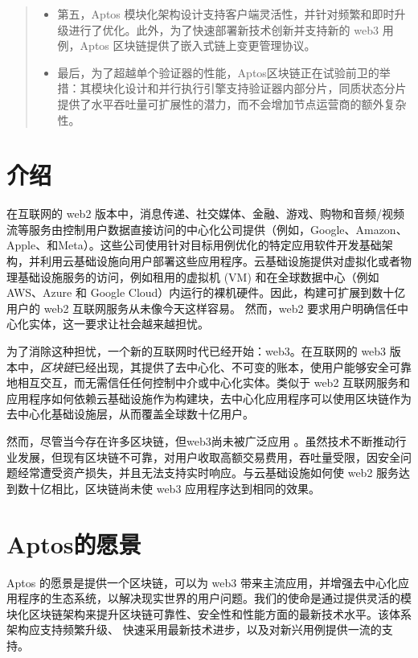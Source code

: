 \documentclass{article}
\begin{document}
\begin{abstract}
\begin{itemize}
 \item 第五，Aptos 模块化架构设计⽀持客户端灵活性，并针对频繁和即时升级进行了优化。此外，为了快速部署新技术创新并⽀持新的 web3 ⽤例，Aptos 区块链提供了嵌⼊式链上变更管理协议。 

 \item 最后，为了超越单个验证器的性能，Aptos区块链正在试验前卫的举措：其模块化设计和并行执行引擎支持验证器内部分片，同质状态分片提供了水平吞吐量可扩展性的潜力，而不会增加节点运营商的额外复杂性。

\end{itemize}

\end{abstract}

\section{介绍}

在互联⽹的 web2 版本中，消息传递、社交媒体、⾦融、游戏、购物和⾳频/视频流等服务由控制⽤户数据直接访问的中⼼化公司提供（例如，Google、Amazon、Apple、和Meta）。这些公司使⽤针对⽬标⽤例优化的特定应⽤软件开发基础架构，并利⽤云基础设施向用户部署这些应用程序。云基础设施提供对虚拟化或者物理基础设施服务的访问，例如租⽤的虚拟机 (VM) 和在全球数据中⼼（例如 AWS、Azure 和 Google Cloud）内运行的裸机硬件。因此，构建可扩展到数⼗亿⽤户的 web2 互联网服务从未像今天这样容易。 然⽽，web2 要求⽤户明确信任中⼼化实体，这⼀要求让社会越来越担忧。

为了消除这种担忧，⼀个新的互联⽹时代已经开始：web3。在互联⽹的 web3 版本中，\emph{区块链}已经出现，其提供了去中心化、不可变的账本，使⽤户能够安全可靠地相互交互，而无需信任任何控制中介或中⼼化实体。类似于 web2 互联⽹服务和应⽤程序如何依赖云基础设施作为构建块，去中⼼化应⽤程序可以使⽤区块链作为去中⼼化基础设施层，从而覆盖全球数⼗亿⽤户。

然⽽，尽管当今存在许多区块链，但web3尚未被广泛应用 \cite{a16_state}。虽然技术不断推动行业发展，但现有区块链不可靠，对⽤户收取⾼额交易费⽤，吞吐量受限，因安全问题经常遭受资产损失，并且⽆法⽀持实时响应。与云基础设施如何使 web2 服务达到数⼗亿相⽐，区块链尚未使 web3 应⽤程序达到相同的效果。


\section{Aptos的愿景}

Aptos 的愿景是提供⼀个区块链，可以为 web3 带来主流应⽤，并增强去中⼼化应⽤程序的⽣态系统，以解决现实世界的⽤户问题。我们的使命是通过提供灵活的模块化区块链架构来提升区块链可靠性、安全性和性能⽅⾯的最新技术⽔平。该体系架构应⽀持频繁升级、 快速采⽤最新技术进步，以及对新兴⽤例提供⼀流的⽀持。
\end{document}
